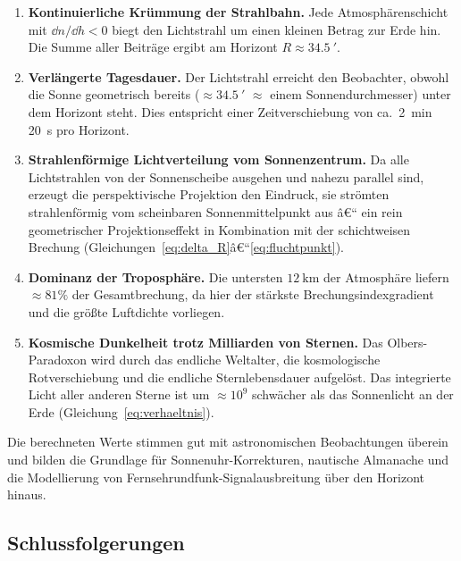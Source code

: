 ﻿\documentclass[12pt,a4paper]{article}
\begin{document}
\begin{enumerate}
  \item \textbf{Kontinuierliche Krümmung der Strahlbahn.}
        Jede Atmosphärenschicht mit $\dd n/\dd h < 0$ biegt den
        Lichtstrahl um einen kleinen Betrag zur Erde hin.
        Die Summe aller Beiträge ergibt am Horizont
        $R \approx \SI{34.5}{\arcminute}$.

  \item \textbf{Verlängerte Tagesdauer.}
        Der Lichtstrahl erreicht den Beobachter,
        obwohl die Sonne geometrisch bereits ($\approx \SI{34.5}{\arcminute}$
        $\approx$ einem Sonnendurchmesser) unter dem Horizont steht.
        Dies entspricht einer Zeitverschiebung von ca.\ \SI{2}{\minute}
        \SI{20}{\second} pro Horizont.

  \item \textbf{Strahlenförmige Lichtverteilung vom Sonnenzentrum.}
        Da alle Lichtstrahlen von der Sonnenscheibe ausgehen
        und nahezu parallel sind, erzeugt die perspektivische
        Projektion den Eindruck, sie strömten strahlenförmig
        vom scheinbaren Sonnenmittelpunkt aus â€“
        ein rein geometrischer Projektionseffekt in Kombination
        mit der schichtweisen Brechung
        (Gleichungen~\ref{eq:delta_R}â€“\ref{eq:fluchtpunkt}).

  \item \textbf{Dominanz der Troposphäre.}
        Die untersten $\SI{12}{\kilo\metre}$ der Atmosphäre
        liefern $\approx 81\%$ der Gesamtbrechung,
        da hier der stärkste Brechungsindexgradient und die
        größte Luftdichte vorliegen.

  \item \textbf{Kosmische Dunkelheit trotz Milliarden von Sternen.}
        Das Olbers-Paradoxon wird durch das endliche Weltalter,
        die kosmologische Rotverschiebung und die endliche
        Sternlebensdauer aufgelöst.
        Das integrierte Licht aller anderen Sterne ist um
        $\approx 10^9$ schwächer als das Sonnenlicht an der Erde
        (Gleichung~\ref{eq:verhaeltnis}).
\end{enumerate}

Die berechneten Werte stimmen gut mit astronomischen Beobachtungen überein
\citep{Stone1996} und bilden die Grundlage für
Sonnenuhr-Korrekturen, nautische Almanache und die Modellierung
von Fernsehrundfunk-Signalausbreitung über den Horizont hinaus.

\subsection{Schlussfolgerungen}
\end{document}
